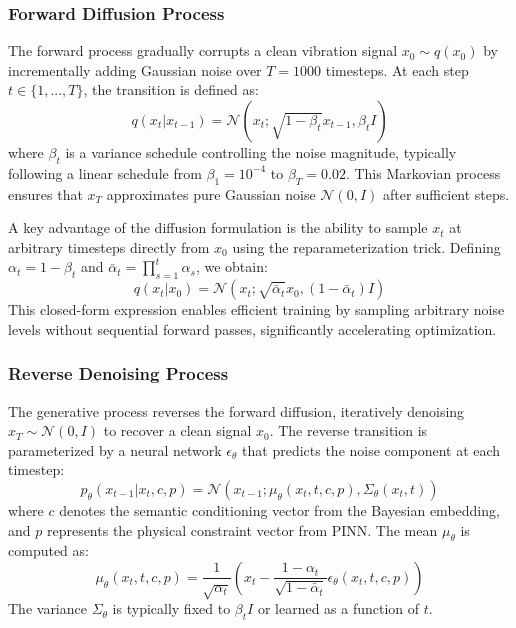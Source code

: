 \subsubsection{Forward Diffusion Process}
The forward process gradually corrupts a clean vibration signal $x_0 \sim q(x_0)$ by incrementally adding Gaussian noise over $T=1000$ timesteps. At each step $t \in \{1, ..., T\}$, the transition is defined as:
\begin{equation}
    q(x_t | x_{t-1}) = \mathcal{N}(x_t; \sqrt{1-\beta_t}x_{t-1}, \beta_t I)
    \label{eq:forward_step}
\end{equation}
where $\beta_t$ is a variance schedule controlling the noise magnitude, typically following a linear schedule from $\beta_1=10^{-4}$ to $\beta_T=0.02$. This Markovian process ensures that $x_T$ approximates pure Gaussian noise $\mathcal{N}(0, I)$ after sufficient steps.

A key advantage of the diffusion formulation is the ability to sample $x_t$ at arbitrary timesteps directly from $x_0$ using the reparameterization trick. Defining $\alpha_t = 1 - \beta_t$ and $\bar{\alpha}_t = \prod_{s=1}^t \alpha_s$, we obtain:
\begin{equation}
    q(x_t | x_0) = \mathcal{N}(x_t; \sqrt{\bar{\alpha}_t}x_0, (1-\bar{\alpha}_t)I)
    \label{eq:forward_marginal}
\end{equation}
This closed-form expression enables efficient training by sampling arbitrary noise levels without sequential forward passes, significantly accelerating optimization.

\subsubsection{Reverse Denoising Process}
The generative process reverses the forward diffusion, iteratively denoising $x_T \sim \mathcal{N}(0, I)$ to recover a clean signal $x_0$. The reverse transition is parameterized by a neural network $\epsilon_\theta$ that predicts the noise component at each timestep:
\begin{equation}
    p_\theta(x_{t-1} | x_t, c, p) = \mathcal{N}(x_{t-1}; \mu_\theta(x_t, t, c, p), \Sigma_\theta(x_t, t))
    \label{eq:reverse_step}
\end{equation}
where $c$ denotes the semantic conditioning vector from the Bayesian embedding, and $p$ represents the physical constraint vector from PINN. The mean $\mu_\theta$ is computed as:
\begin{equation}
    \mu_\theta(x_t, t, c, p) = \frac{1}{\sqrt{\alpha_t}} \left( x_t - \frac{1-\alpha_t}{\sqrt{1-\bar{\alpha}_t}} \epsilon_\theta(x_t, t, c, p) \right)
    \label{eq:reverse_mean}
\end{equation}
The variance $\Sigma_\theta$ is typically fixed to $\beta_t I$ or learned as a function of $t$.

